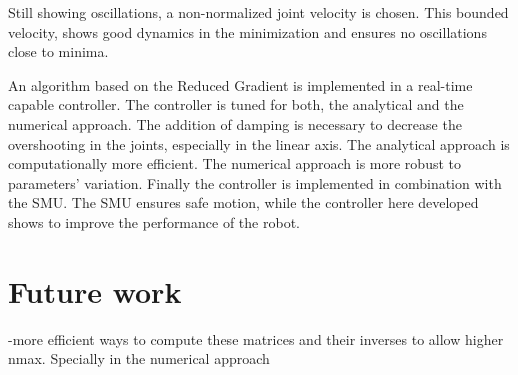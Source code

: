 Still showing oscillations, a  non-normalized joint velocity is chosen. This bounded velocity,  shows good dynamics in the minimization and ensures no oscillations close to minima.

An algorithm based on the Reduced  Gradient is implemented in a real-time capable controller. The controller is tuned for both, the analytical and the numerical approach. The addition of damping is necessary to decrease the overshooting in the joints, especially in the linear axis. The analytical approach is  computationally more efficient. The numerical approach is more robust to parameters' variation.
Finally the controller is implemented in combination with the SMU. The SMU ensures safe motion, while the controller here developed shows to improve the performance of the robot.



%
%
\section{Future work}
-more efficient ways to compute these matrices and their inverses to allow higher nmax. Specially in the numerical approach

